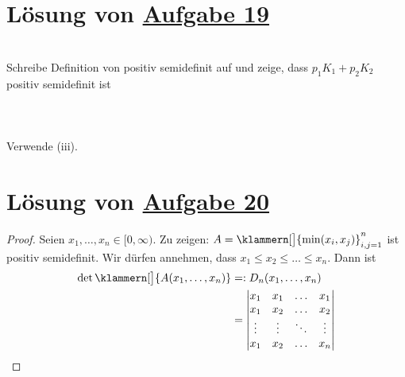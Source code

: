 \section{Lösung von 
	\texorpdfstring{\hyperref[aufg:19]{Aufgabe 19}}{}
}\label{loes:19}

\\
Schreibe Definition von positiv semidefinit auf und zeige, dass $p_1 K_1+p_2 K_2$ positiv semidefinit ist\nl
{}\\
\\
\\
\\
Verwende (iii).

\section{Lösung von 
	\texorpdfstring{\hyperref[aufg:20]{Aufgabe 20}}{}
}\label{loes:20}

\begin{proof}
	Seien $x_1,\ldots,x_n\in[0,\infty)$.
	Zu zeigen: $A=\klammern[\big]{\min(x_i,x_j)}_{i,j=1}^n$ ist positiv semidefinit.
	Wir dürfen annehmen, dass $x_1\leq x_2\leq\ldots\leq x_n$.
	Dann ist
	\begin{align*}
		\det\klammern[\big]{A(x_1,\ldots,x_n)}
		&=:D_n(x_1,\ldots,x_n)\\
		&=\begin{vmatrix}
			x_1 & x_1 & \ldots & x_1\\
			x_1 & x_2 & \ldots & x_2\\
			\vdots & \vdots & \ddots & \vdots\\
			x_1 & x_2 & \ldots & x_n
		\end{vmatrix}
	\end{align*}
\end{proof}
